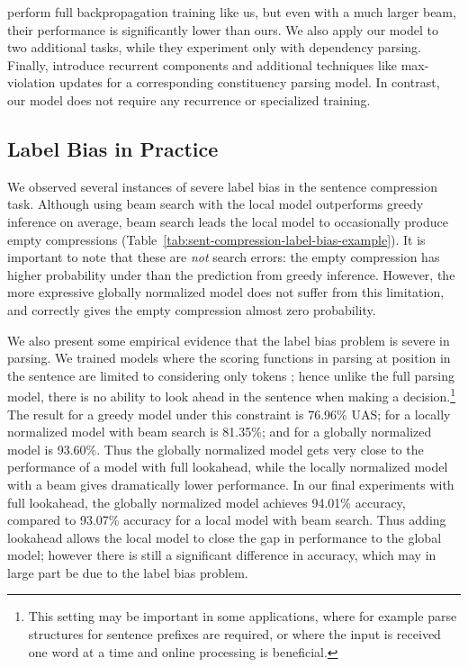 \documentclass[11pt]{article}
\begin{document}
 perform full 
backpropagation training like us, 
but even with a much larger beam, their performance is significantly
lower than ours. We also apply our model to two additional tasks,
while they experiment only with dependency parsing.
Finally,  introduce recurrent
components and additional techniques like max-violation updates
for a corresponding constituency parsing model.
In contrast, our model does not require any recurrence
or specialized training.

\subsection{Label Bias in Practice}

We observed several instances of severe label bias in the sentence
compression task.  Although using beam search with the local model
outperforms greedy inference on average, beam search leads the local
model to occasionally produce empty compressions
(Table~\ref{tab:sent-compression-label-bias-example}).  It is important to
note that these are {\em not} search errors: the empty compression has
higher probability under  than the prediction from greedy
inference. However, the more expressive globally normalized model
does not suffer from this limitation, and correctly gives the empty
compression almost zero probability.

We also present some
empirical evidence that the label bias problem is severe in
parsing. We trained models where the scoring functions in parsing
at position  in the sentence are limited to considering only tokens
; hence unlike the full parsing model, there is no
ability to look ahead in the sentence when making a
decision.\footnote{This setting may be important in some applications,
  where for example parse structures for sentence prefixes are
  required, or where the input is received one word at a time and
  online processing is beneficial.} The result for a greedy model
under this constraint is 76.96\% UAS; for a locally normalized model
with beam search is 81.35\%; and for a globally normalized model
is 93.60\%. Thus the globally normalized model gets very close to the
performance of a model with full lookahead, while the locally
normalized model with a beam gives dramatically lower performance.  In
our final experiments with full lookahead, the globally normalized
model achieves 94.01\% accuracy, compared to 93.07\% accuracy for a
local model with beam search. Thus adding lookahead allows the local
model to close the gap in performance to the global model; however
there is still a significant difference in accuracy, which may in
large part be due to the label bias problem.
\end{document}
